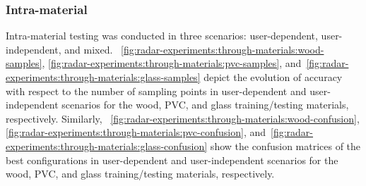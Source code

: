 \subsubsection{Intra-material} \label{sec:radar-experiments:through-materials:results:intra-material}
Intra-material testing was conducted in three scenarios: user-dependent, user-independent, and mixed.
%
\fig~\ref{fig:radar-experiments:through-materials:wood-samples}, \ref{fig:radar-experiments:through-materials:pvc-samples}, and~\ref{fig:radar-experiments:through-materials:glass-samples} depict the evolution of accuracy with respect to the number of sampling points in user-dependent and user-independent scenarios for the wood, PVC, and glass training/testing materials, respectively.
%
Similarly, \fig~\ref{fig:radar-experiments:through-materials:wood-confusion}, \ref{fig:radar-experiments:through-materials:pvc-confusion}, and~\ref{fig:radar-experiments:through-materials:glass-confusion} show the confusion matrices of the best configurations in user-dependent and user-independent scenarios for the wood, PVC, and glass training/testing materials, respectively.

